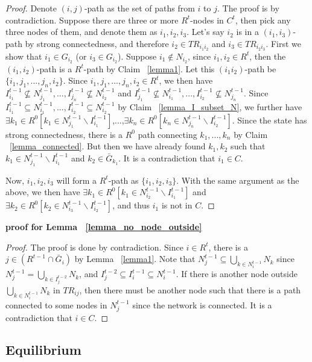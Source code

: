 \documentclass[12pt,letter]{article}
\theoremstyle{definition}
\theoremstyle{remark}
\theoremstyle{claim}
\begin{document}
\begin{proof}
Denote $(i,j)$-path as the set of paths from $i$ to $j$. The proof is by contradiction. Suppose there are three or more $R^t$-nodes in $C^t$, then pick any three nodes of them, and denote them as $i_1,i_2,i_3$. Let's say $i_2$ is in a $(i_1,i_3)$-path by strong connectedness, and therefore $i_2\in TR_{i_1i_2}$ and $i_3\in TR_{i_2i_3}$. First we show that $i_1\in G_{i_2}$ (or $i_3\in G_{i_2}$). Suppose $i_1\notin N_{i_2}$, since $i_1,i_2\in R^t$, then the $(i_1,i_2)$-path is a $R^t$-path by Claim ~\ref{lemma1}. Let this $(i_1i_2)$-path be $\{i_1,j_1,...,j_n,i_2\}$. Since $i_1,j_1,...,j_n,i_2\in R^t$, we then have $I^{t-1}_{i_1}\nsubseteq N^{t-1}_{j_1},...,I^{t-1}_{j_n}\nsubseteq N^{t-1}_{i_2}$ and $I^{t-1}_{j_1}\nsubseteq N^{t-1}_{i_1},...,I^{t-1}_{i_2}\nsubseteq N^{t-1}_{j_n}$. Since $I^{t-1}_{i_1}\subseteq N^{t-1}_{i_1},...,I^{t-1}_{i_2}\subseteq N^{t-1}_{i_2}$ by Claim ~\ref{lemma_I_subset_N}, we further have $\exists k_1\in R^0[k_1\in N^{t-1}_{j_1}\backslash I^{t-1}_{i_1}]$,...,$\exists k_n\in R^0[k_n\in N^{t-1}_{j_n}\backslash I^{t-1}_{i_2}]$. Since the state has strong connectedness, there is a $R^0$ path connecting $k_1,...,k_n$ by Claim ~\ref{lemma_connected}. But then we have already found $k_1,k_2$ such that $k_1\in N^{t-1}_{j_1}\backslash I^{t-1}_{i_1}$ and $k_2\in \bar{G}_{k_1}$. It is a contradiction that $i_1\in C$.

Now, $i_1,i_2,i_3$ will form a $R^t$-path as $\{i_1,i_2,i_3\}$. With the same argument as the above, we then have $\exists k_1\in R^0[k_1\in N^{t-1}_{i_2}\backslash I^{t-1}_{i_1}]$ and $\exists k_2\in R^0[k_2\in N^{t-1}_{i_3}\backslash I^{t-1}_{i_2}]$, and thus $i_1$ is not in $C$.
\end{proof}


\noindent\textbf{proof for Lemma ~\ref{lemma_no_node_outside}}
\begin{proof}
The proof is done by contradiction. Since $i\in R^t$, there is a $j\in (R^{t-1}\cap \bar{G}_i)$ by Lemma ~\ref{lemma1}. Note that $N^{t-1}_j\subseteq \bigcup_{k\in N^{t-1}_i}N_k$ since $N^{t-1}_j =\bigcup_{k\in I^{t-2}_j}N_k$, and $I^{t-2}_j\subseteq I^{t-1}_i\subseteq N^{t-1}_i$. If there is another node outside $\bigcup_{k\in N^{t-1}_i}N_k$ in $TR_{ij}$, then there must be another node such that there is a path connected to some nodes in $N^{t-1}_j$ since the network is connected. It is a contradiction that $i\in C$.

\end{proof}

\subsection{Equilibrium}
\label{appx_network_equilibrium}
\end{document}
